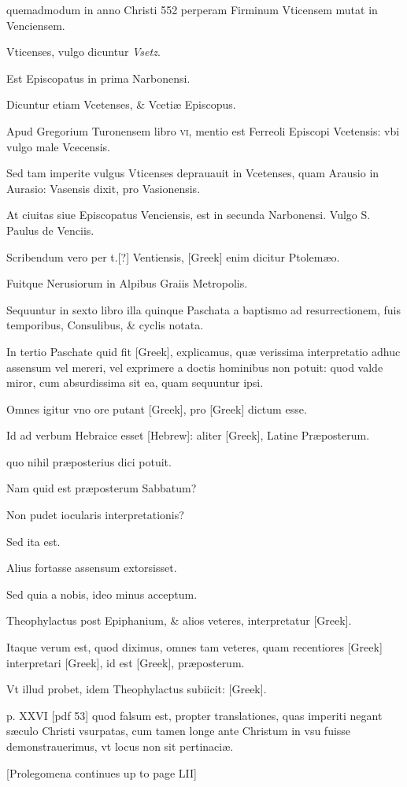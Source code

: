 \begin{parnumbers}
quemadmodum in anno Christi 552 perperam Firminum
Vticensem mutat in Venciensem.

Vticenses, vulgo dicuntur \textit{Vsetz}.

Est Episcopatus in prima Narbonensi.

Dicuntur etiam Vcetenses,
\& Vcetiæ Episcopus.

Apud Gregorium Turonensem libro \textsc{vi},
mentio est Ferreoli Episcopi Vcetensis: vbi vulgo male Vcecensis.

Sed tam imperite vulgus Vticenses deprauauit in Vcetenses, quam
Arausio in Aurasio: Vasensis dixit, pro Vasionensis.

At ciuitas siue
Episcopatus Venciensis, est in secunda Narbonensi. Vulgo S. Paulus
de Venciis.

Scribendum vero per t.[?] Ventiensis, \textgreek{[Greek]} enim dicitur
Ptolemæo.

Fuitque Nerusiorum in Alpibus Graiis Metropolis.

Sequuntur in sexto libro illa quinque Paschata a baptismo
ad resurrectionem, fuis temporibus, Consulibus, \& cyclis notata.

In tertio Paschate quid fit \textgreek{[Greek]}, explicamus,
quæ verissima interpretatio adhuc assensum vel mereri, vel
exprimere a doctis hominibus non potuit: quod valde miror,
cum absurdissima sit ea, quam sequuntur ipsi.

Omnes igitur vno
ore putant \textgreek{[Greek]}, pro \textgreek{[Greek]} dictum esse.

Id ad verbum
Hebraice esset \texthebrew{[Hebrew]}:
 aliter \textgreek{[Greek]}, Latine Præposterum.

quo nihil præposterius dici potuit.

Nam quid est præposterum Sabbatum?

Non pudet iocularis interpretationis?

Sed ita est.

Alius fortasse assensum extorsisset.

Sed quia a nobis, ideo
minus acceptum.

Theophylactus post Epiphanium, \& alios veteres,
interpretatur \textgreek{[Greek]}.

Itaque verum est, quod diximus, omnes tam veteres, quam
recentiores \textgreek{[Greek]} interpretari
 \textgreek{[Greek]}, id est \textgreek{[Greek]},
præposterum.

Vt illud probet, idem Theophylactus
subiicit: \textgreek{[Greek]}.

\clearpage
p. XXVI [pdf 53]
quod falsum est,
propter translationes, quas imperiti negant sæculo Christi vsurpatas,
cum tamen longe ante Christum in vsu fuisse demonstrauerimus,
vt locus non sit pertinaciæ.

[Prolegomena continues up to page LII]

\end{parnumbers}
